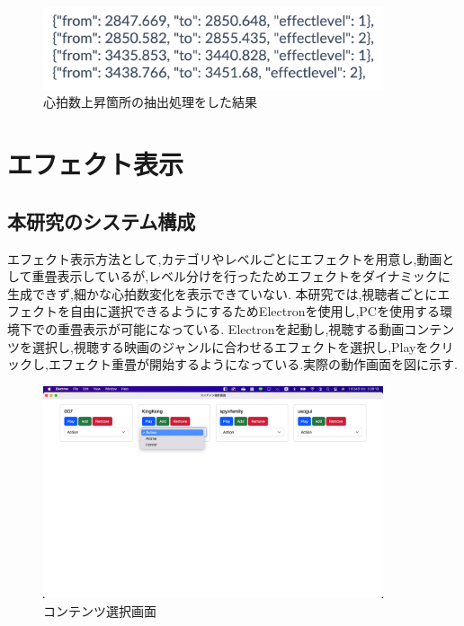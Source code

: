 \begin{figure}[H]
    \centering
    \includegraphics[width=10cm]{images/chapter3/level.png}
    \caption{心拍数上昇箇所の抽出処理をした結果}
\end{figure}

\section{エフェクト表示}
\subsection{本研究のシステム構成}
エフェクト表示方法として,カテゴリやレベルごとにエフェクトを用意し,動画として重畳表示しているが,レベル分けを行ったためエフェクトをダイナミックに生成できず,細かな心拍数変化を表示できていない.
本研究では,視聴者ごとにエフェクトを自由に選択できるようにするためElectronを使用し,PCを使用する環境下での重畳表示が可能になっている.
Electronを起動し,視聴する動画コンテンツを選択し,視聴する映画のジャンルに合わせるエフェクトを選択し,Playをクリックし,エフェクト重畳が開始するようになっている.実際の動作画面を図に示す.

\begin{figure}[H]
    \centering
    \includegraphics[width=10cm]{images/chapter3/contents.jpg}
    \caption{コンテンツ選択画面}
\end{figure}

